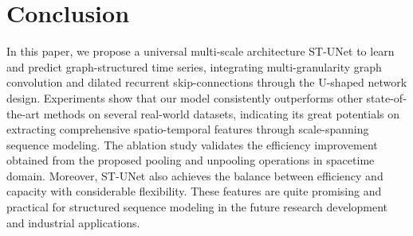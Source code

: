 \documentclass[sigconf,screen]{acmart}
\begin{document}
\begin{table}
\centering
\caption{\label{tab:large}Comparison of GCN-based models in terms of prediction accuracy on the large-scale dataset PeMS-L.}
\end{table}


\section{Conclusion}
In this paper, we propose a universal multi-scale architecture ST-UNet to learn and predict graph-structured time series, integrating multi-granularity graph convolution and dilated recurrent skip-connections through the U-shaped network design. Experiments show that our model consistently outperforms other state-of-the-art methods on several real-world datasets, indicating its great potentials on extracting comprehensive spatio-temporal features through scale-spanning sequence modeling. The ablation study validates the efficiency improvement obtained from the proposed pooling and unpooling operations in spacetime domain. Moreover, ST-UNet also achieves the balance between efficiency and capacity with considerable flexibility. These features are quite promising and practical for structured sequence modeling in the future research development and industrial applications.



\end{document}
